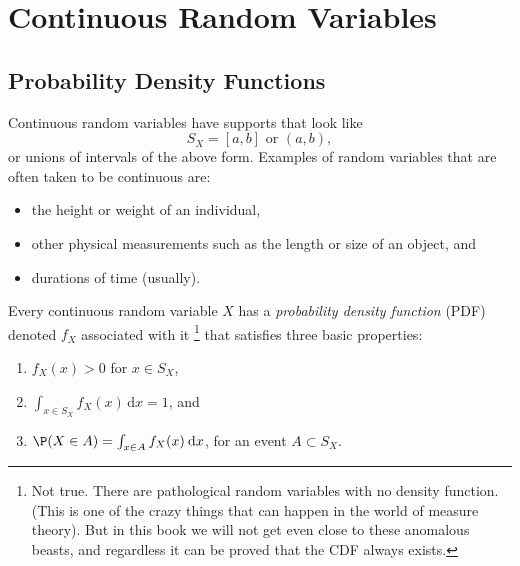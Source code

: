 \documentclass[captions=tableheading]{scrbook}
\begin{document}
\section{Continuous Random Variables}
\label{sec-6-1}

\label{sec:continuous-random-variables}
\subsection{Probability Density Functions}
\label{sec-6-1-1}

\label{sub:probability-density-functions}

Continuous random variables have supports that look like
\begin{equation}
S_{X}=[a,b]\mbox{ or }(a,b),
\end{equation}
or unions of intervals of the above form. Examples of random variables that are often taken to be continuous are:

\begin{itemize}
\item the height or weight of an individual,
\item other physical measurements such as the length or size of an object, and
\item durations of time (usually).
\end{itemize}

Every continuous random variable \(X\) has a \emph{probability density function} (PDF) denoted \(f_{X}\) associated with it
\footnote{Not true. There are pathological random variables with no density function. (This is one of the crazy things that can happen in the world of measure theory). But in this book we will not get even close to these anomalous beasts, and regardless it can be proved that the CDF always exists.}
that satisfies three basic properties:
\begin{enumerate}
\item \(f_{X}(x)>0\) for \(x\in S_{X}\),
\item \(\int_{x\in S_{X}}f_{X}(x)\,\mathrm{d} x=1\), and
\item \(\P(X\in A)=\int_{x\in A}f_{X}(x)\:\mathrm{d} x\), for an event \(A\subset S_{X}\).
\end{enumerate}
\label{enu: contrvcond3}
\end{document}
